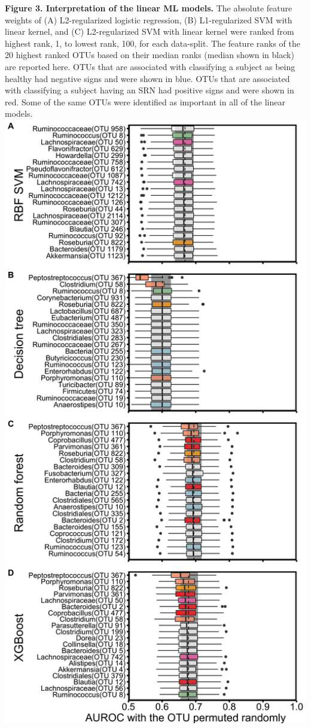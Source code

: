 \documentclass[11pt,]{article}
\begin{document}
\textbf{Figure 3. Interpretation of the linear ML models.} The absolute
feature weights of (A) L2-regularized logistic regression, (B)
L1-regularized SVM with linear kernel, and (C) L2-regularized SVM with
linear kernel were ranked from highest rank, 1, to lowest rank, 100, for
each data-split. The feature ranks of the 20 highest ranked OTUs based
on their median ranks (median shown in black) are reported here. OTUs
that are associated with classifying a subject as being healthy had
negative signs and were shown in blue. OTUs that are associated with
classifying a subject having an SRN had positive signs and were shown in
red. Some of the same OTUs were identified as important in all of the
linear models. \newpage
\includegraphics{Figure_4.png}
\end{document}
